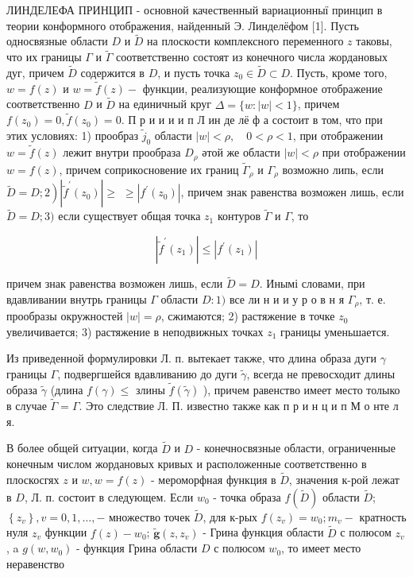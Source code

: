 \documentclass[10pt]{article}
\begin{document}
ЛИНДЕЛЕФА ПРИНЦИП - основной качественный вариационныї принцип в теории конформного отображения, найденный Э. Линделёфом [1]. Пусть односвязные области $D$ и $\tilde{D}$ на плоскости комплексного переменного $z$ таковы, что их границы $\Gamma$ и $\tilde{\Gamma}$ соответственно состоят из конечного числа жордановых дуг, причем $\tilde{D}$ содержится в $D$, и пусть точка $z_{0} \in \tilde{D} \subset D$. Пусть, кроме того, $w=f(z)$ и $w=\tilde{f}(z)-$ функции, реализующие конформное отображение соответственно $D$ и $\tilde{D}$ на единичный круг $\Delta=\{w:|w|<1\}$, причем $f\left(z_{0}\right)=0, \tilde{f}\left(z_{0}\right)=0$. П р и и и и п Л ин де лё $ф$ а состоит в том, что при этих условиях: 1) прообраз $\tilde{j}_{0}$ области $|w|<\rho, \quad 0<\rho<1$, при отображении $w=\tilde{f}(z)$ лежит внутри прообраза $D_{\rho}$ әтой же области $|w|<\rho$ при отображении $w=f(z)$, причем соприкосновение их границ $\tilde{\Gamma}_{\rho}$ и $\Gamma_{\rho}$ возможно липь, если $\left.\tilde{D}=D ; 2\right)\left|\tilde{f}^{\prime}\left(z_{0}\right)\right| \geqslant$ $\geqslant\left|f^{\prime}\left(z_{0}\right)\right|$, причем знак равенства возможен лишь, если $\tilde{D}=D ; 3)$ если существует общая точка $z_{1}$ контуров $\tilde{\Gamma}$ и $\Gamma$, то



\[

\left|\tilde{f}^{\prime}\left(z_{1}\right)\right| \leqslant\left|f^{\prime}\left(z_{1}\right)\right|

\]



причем знак равенства возможен лишь, если $\tilde{D}=D$. Инымі словами, при вдавливании внутрь границы $\Gamma$ области $D: 1)$ все ли н и и у р о в н я $\Gamma_{\rho}$, т. е. прообразы окружностей $|w|=\rho$, сжимаются; 2) растяжение в точке $z_{0}$ увеличивается; 3) растяжение в неподвижных точках $z_{1}$ границы уменьшается.



Из приведенной формулировки Л. п. вытекает также, что длина образа дуги $\gamma$ границы $\Gamma$, подвергшейся вдавливанию до дуги $\tilde{\gamma}$, всегда не превосходит длины образа $\tilde{\gamma}$ (длина $f(\gamma) \leqslant$ злины $\tilde{f}(\tilde{\gamma})$ ), причем равенство имеет место толыко в случае $\tilde{\Gamma}=\Gamma$. Это следствие Л. П. известно также как п р и н ц и п М о нте л я.



В более общей ситуации, когда $\tilde{D}$ и $D$ - конечносвязные области, ограниченные конечным числом жордановых кривых и расположенные соответственно в плоскосгях $z$ и $w, w=f(z)$ - мероморфная функция в $\tilde{D}$, значения к-рой лежат в $D$, Л. п. состоит в следующем. Если $w_{0}$ - точка образа $f(\tilde{D})$ области $\tilde{D}$; $\left\{z_{v}\right\}, v=0,1, \ldots,-$ множество точек $\tilde{D}$, для к-рых $f\left(z_{v}\right)=w_{0} ; m_{v}-$ кратность нуля $z_{v}$ функции $f(z)-w_{0}$; $\tilde{\boldsymbol{g}}\left(z, z_{v}\right)$ - Грина функция области $\tilde{D}$ с полюсом $z_{v}$, a $g\left(w, w_{0}\right)$ - функция Грина области $D$ с полюсом $w_{0}$, то имеет место неравенство
\end{document}
